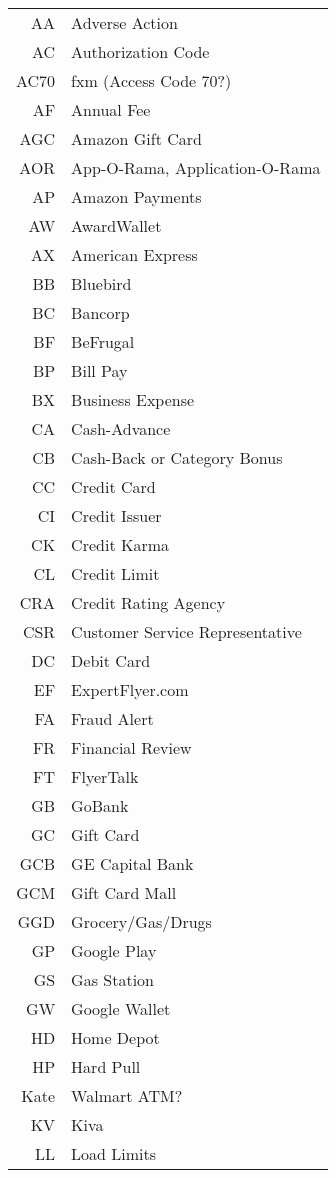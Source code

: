 \documentclass[12pt,twoside]{article}
\begin{document}
\begin{longtable}[>{\bfseries}l]{>{\ttfamily}r l}
AA & Adverse Action \\
AC & Authorization Code \\
AC70 & fxm (Access Code 70?) \\
AF & Annual Fee \\
AGC & Amazon Gift Card \\
AOR & App-O-Rama, Application-O-Rama \\
AP & Amazon Payments \\
AW & AwardWallet \\
AX & American Express \\
BB & Bluebird \\
BC & Bancorp \\
BF & BeFrugal \\
BP & Bill Pay \\
BX & Business Expense \\
CA & Cash-Advance \\
CB & Cash-Back or Category Bonus \\
CC & Credit Card \\
CI & Credit Issuer \\
CK & Credit Karma \\
CL & Credit Limit \\
CRA & Credit Rating Agency \\
CSR & Customer Service Representative \\
DC & Debit Card \\
EF & ExpertFlyer.com \\
FA & Fraud Alert \\
FR & Financial Review \\
FT & FlyerTalk \\
GB & GoBank \\
GC & Gift Card \\
GCB & GE Capital Bank \\
GCM & Gift Card Mall \\
GGD & Grocery/Gas/Drugs \\
GP & Google Play \\
GS & Gas Station \\
GW & Google Wallet \\
HD & Home Depot \\
HP & Hard Pull \\
Kate & Walmart ATM? \\
KV & Kiva \\
LL & Load Limits \\

\end{longtable}
\end{document}

